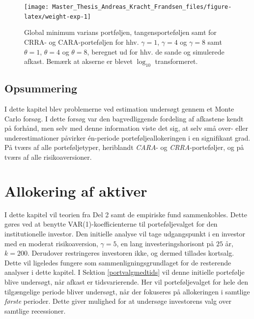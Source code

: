 \documentclass[
  a4paper,
  oneside]{memoir}
\begin{document}
\begin{figure}[H]

{\centering \texttt{[image: Master\_Thesis\_Andreas\_Kracht\_Frandsen\_files/figure-latex/weight-exp-1]} 

}

\caption{Global minimum varians portføljen, tangensporteføljen samt for CRRA- og CARA-porteføljen for hhv. $\gamma=1$, $\gamma=4$ og $\gamma=8$ samt $\theta=1$, $\theta=4$ og $\theta=8$, beregnet ud for hhv. de sande og simulerede afkast. Bemærk at akserne er blevet $\log_{10}$ transformeret.}\label{fig:weight-exp}
\end{figure}

\hypertarget{opsummering-3}{%
\section{Opsummering}\label{opsummering-3}}

I dette kapitel blev problemerne ved estimation undersøgt gennem et Monte Carlo forsøg. I dette forsøg var den bagvedliggende fordeling af afkastene kendt på forhånd, men selv med denne information viste det sig, at selv små over- eller underestimationer påvirker én-periode porteføljeallokeringen i en signifikant grad. På tværs af alle porteføljetyper, heriblandt \emph{CARA}- og \emph{CRRA}-porteføljer, og på tværs af alle risikoaversioner.

\hypertarget{alloafakt}{%
\chapter{Allokering af aktiver}\label{alloafakt}}

I dette kapitel vil teorien fra Del 2 samt de empiriske fund sammenkobles. Dette gøres ved at benytte VAR(1)-koefficienterne til porteføljevalget for den institutionelle investor. Den initielle analyse vil tage udgangspunkt i en investor med en moderat risikoaversion, \(\gamma=5\), en lang investeringshorisont på \(25\) år, \(k=200\). Derudover restringeres investoren ikke, og dermed tillades kortsalg. Dette vil ligeledes fungere som sammenligningsgrundlaget for de resterende analyser i dette kapitel. I Sektion \ref{portvalgmedtids} vil denne initielle portefølje blive undersøgt, når afkast er tidsvarierende. Her vil porteføljevalget for hele den tilgængelige periode bliver undersøgt, når der fokuseres på allokeringen i samtlige \emph{første} perioder. Dette giver mulighed for at undersøge investorens valg over samtlige recessioner.
\end{document}
